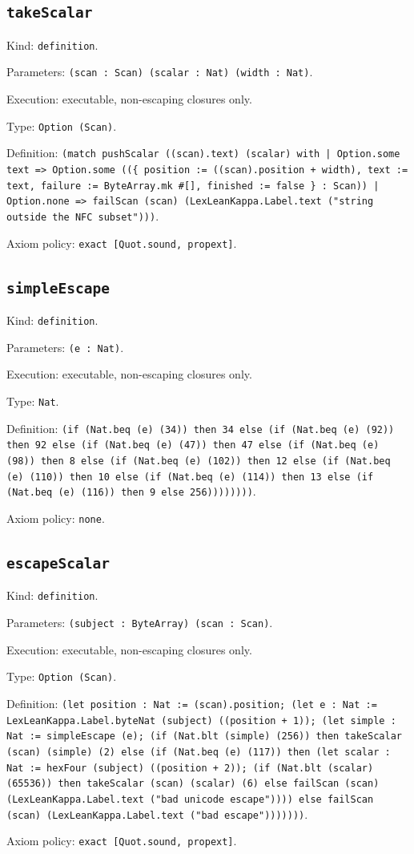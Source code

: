 \documentclass[11pt]{article}
\begin{document}
\subsection*{\texttt{takeScalar}}
\noindent Kind: \texttt{definition}.\par
\noindent Parameters: \texttt{(scan : Scan) (scalar : Nat) (width : Nat)}.\par
\noindent Execution: executable, non-escaping closures only.\par
\noindent Type: \texttt{Option (Scan)}.\par
\noindent Definition: \texttt{(match pushScalar ((scan).text) (scalar) with | Option.some text => Option.some ((\{ position := ((scan).position + width), text := text, failure := ByteArray.mk \#[], finished := false \} : Scan)) | Option.none => failScan (scan) (LexLeanKappa.Label.text ("string outside the NFC subset")))}.\par
\noindent Axiom policy: \texttt{exact [Quot.sound, propext]}.\par
\subsection*{\texttt{simpleEscape}}
\noindent Kind: \texttt{definition}.\par
\noindent Parameters: \texttt{(e : Nat)}.\par
\noindent Execution: executable, non-escaping closures only.\par
\noindent Type: \texttt{Nat}.\par
\noindent Definition: \texttt{(if (Nat.beq (e) (34)) then 34 else (if (Nat.beq (e) (92)) then 92 else (if (Nat.beq (e) (47)) then 47 else (if (Nat.beq (e) (98)) then 8 else (if (Nat.beq (e) (102)) then 12 else (if (Nat.beq (e) (110)) then 10 else (if (Nat.beq (e) (114)) then 13 else (if (Nat.beq (e) (116)) then 9 else 256))))))))}.\par
\noindent Axiom policy: \texttt{none}.\par
\subsection*{\texttt{escapeScalar}}
\noindent Kind: \texttt{definition}.\par
\noindent Parameters: \texttt{(subject : ByteArray) (scan : Scan)}.\par
\noindent Execution: executable, non-escaping closures only.\par
\noindent Type: \texttt{Option (Scan)}.\par
\noindent Definition: \texttt{(let position : Nat := (scan).position; (let e : Nat := LexLeanKappa.Label.byteNat (subject) ((position + 1)); (let simple : Nat := simpleEscape (e); (if (Nat.blt (simple) (256)) then takeScalar (scan) (simple) (2) else (if (Nat.beq (e) (117)) then (let scalar : Nat := hexFour (subject) ((position + 2)); (if (Nat.blt (scalar) (65536)) then takeScalar (scan) (scalar) (6) else failScan (scan) (LexLeanKappa.Label.text ("bad unicode escape")))) else failScan (scan) (LexLeanKappa.Label.text ("bad escape")))))))}.\par
\noindent Axiom policy: \texttt{exact [Quot.sound, propext]}.\par
\end{document}
